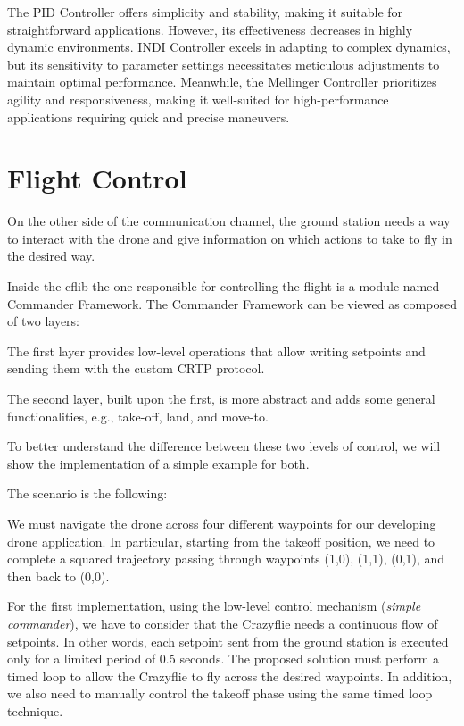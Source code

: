 The PID Controller offers simplicity and stability, making it suitable for straightforward applications. However, its effectiveness decreases in highly dynamic environments. 
INDI Controller excels in adapting to complex dynamics, but its sensitivity to parameter settings necessitates meticulous adjustments to maintain optimal performance.
Meanwhile, the Mellinger Controller prioritizes agility and responsiveness, making it well-suited for high-performance applications requiring quick and precise maneuvers. 


\section{Flight Control}\label{sec:flight_control}
On the other side of the communication channel, the ground station needs a way to interact with the drone and give information on which actions to take to fly in the desired way.


Inside the cflib the one responsible for controlling the flight is a module named Commander Framework.
The Commander Framework can be viewed as composed of two layers:

The first layer provides low-level operations that allow writing setpoints and sending them with the custom CRTP protocol.

The second layer, built upon the first, is more abstract and adds some general functionalities, e.g., take-off, land, and move-to.

To better understand the difference between these two levels of control, we will show the implementation of a simple example for both.


The scenario is the following:
\begin{displayquote}
    We must navigate the drone across four different waypoints for our developing drone application.
    In particular, starting from the takeoff position, we need to complete a squared trajectory passing through waypoints (1,0), (1,1), (0,1), and then back to (0,0).
\end{displayquote}

For the first implementation, using the low-level control mechanism (\textit{simple commander}), we have to consider that the Crazyflie needs a continuous flow of setpoints. 
In other words, each setpoint sent from the ground station is executed only for a limited period of 0.5 seconds.
The proposed solution must perform a timed loop to allow the Crazyflie to fly across the desired waypoints.
In addition, we also need to manually control the takeoff phase using the same timed loop technique.

